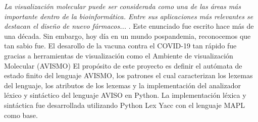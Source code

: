 \textit{La visualización molecular puede ser considerada como una de las áreas más importante dentro de la bioinformática. Entre sus aplicaciones más relevantes se destacan el diseño de nuevo fármacos...} \cite{narciso_farias_gramatica_2012}.
Este enunciado fue escrito hace más de una década. Sin embargo, hoy día en un mundo pospandemia, reconocemos que tan sabio fue.
El desarollo de la vacuna contra el COVID-19 tan rápido fue gracias a herramientas de visualización como el Ambiente de visualización Molecular (AVISMO) \cite{narciso_farias_gramatica_2012}
El propósito de este proyecto es definir el autómata de estado finito del lenguaje AVISMO, los patrones el cual caracterizan los lexemas del lenguaje, los atributos de los lexemas y la implementación del analizador léxico y sintáctico del lenguaje AVISO en Python.
La implementación léxica y sintáctica fue desarrollada utilizando Python Lex Yacc \cite{noauthor_ply_nodate} con el lenguaje MAPL \cite{noauthor_pl-project-lgm-yvv-amnmapl_nodate} como base.
